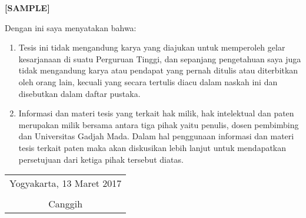 \begin{center}
	\textbf{[SAMPLE]}
\end{center}

\noindent Dengan ini saya menyatakan bahwa:\\
\begin{enumerate}
	\item Tesis ini tidak mengandung karya yang diajukan untuk memperoleh gelar kesarjanaan di suatu  Perguruan Tinggi, dan sepanjang  pengetahuan saya juga tidak mengandung karya atau pendapat yang pernah ditulis atau diterbitkan oleh orang lain, kecuali yang secara tertulis diacu dalam naskah ini dan disebutkan dalam daftar pustaka.
	\item Informasi dan materi tesis yang terkait hak milik, hak intelektual dan paten merupakan milik bersama antara tiga pihak yaitu penulis, dosen pembimbing dan Universitas Gadjah Mada. Dalam hal penggunaan informasi dan materi tesis terkait paten maka akan diskusikan lebih lanjut untuk mendapatkan persetujuan dari ketiga pihak tersebut diatas.
\end{enumerate}
\begin{flushright}
	\begin{tabular}{c}
		Yogyakarta, 13 Maret 2017 \\
		\vspace{1cm} \\
		Canggih
	\end{tabular}
\end{flushright}